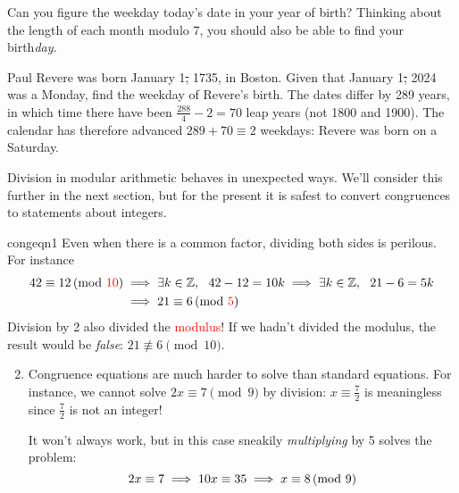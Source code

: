 Can you figure the weekday today's date in your year of birth? Thinking about the length of each month modulo 7, you should also be able to find your birth\emph{day.}

\begin{example}{}{}
	Paul Revere was born January 1\st, 1735, in Boston. Given that January 1\st, 2024 was a Monday, find the weekday of Revere's birth.\smallbreak
	The dates differ by 289 years, in which time there have been $\frac{288}4-2=70$ leap years (not 1800 and 1900). The calendar has therefore advanced $289+70\equiv 2$ weekdays: Revere was born on a Saturday.
\end{example}



Division in modular arithmetic behaves in unexpected ways. We'll consider this further in the next section, but for the present it is safest to convert congruences to statements about integers.

\begin{examples}{}{congeqn1}
	\exstart Even when there is a common factor, dividing both sides is perilous. For instance
	\begin{align*}
		42\equiv 12\negthickspace\pmod{\textcolor{red}{10}}&\implies \exists k\in\mathbb{Z},\ \ 42-12=10k \implies \exists k\in\mathbb{Z},\ \ 21-6=5k\\
		&\implies 21\equiv 6\negthickspace\pmod{\textcolor{red}{5}}
	\end{align*}
	Division by 2 also divided the \textcolor{red}{modulus}! If we hadn't divided the modulus, the result would be \emph{false}: $21\not\equiv 6\pmod{10}$.
			
	\begin{enumerate}\setcounter{enumi}{1}
		\item Congruence equations are much harder to solve than standard equations. For instance, we cannot solve $2x\equiv 7\pmod 9$ by division: $x\equiv \frac 72$ is meaningless since $\frac 72$ is not an integer!\par 		It won't always work, but in this case sneakily \emph{multiplying} by 5 solves the problem:
		\[
			2x\equiv 7\implies 10x\equiv 35\implies x\equiv 8\negthickspace\pmod{9}
		\]
	\end{enumerate}
\end{examples}


